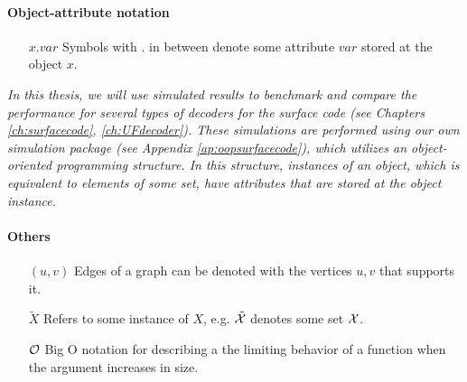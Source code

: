 \paragraph{Object-attribute notation}
\begin{itemize}[leftmargin=4em, align=left]
    \item[$x.var$]  Symbols with $.$ in between denote some attribute $var$ stored at the object $x$.
\end{itemize}
\emph{In this thesis, we will use simulated results to benchmark and compare the performance for several types of decoders for the surface code (see Chapters \ref{ch:surfacecode}, \ref{ch:UFdecoder}). These simulations are performed using our own simulation package (see Appendix \ref{ap:oopsurfacecode}), which utilizes an object-oriented programming structure. In this structure, instances of an object, which is equivalent to elements of some set, have attributes that are stored at the object instance.}

\paragraph{Others}
\begin{itemize}[leftmargin=4em, align=left]
    \item[$(u,v)$]  Edges of a graph can be denoted with the vertices $u,v$ that supports it.
    \item[$\tilde{X}$]  Refers to some instance of $X$, e.g. $\tilde{\mathcal{X}}$ denotes some set $\mathcal{X}$. 
    \item[$\mathcal{O}$] Big O notation for describing a the limiting behavior of a function when the argument increases in size. 
\end{itemize}






